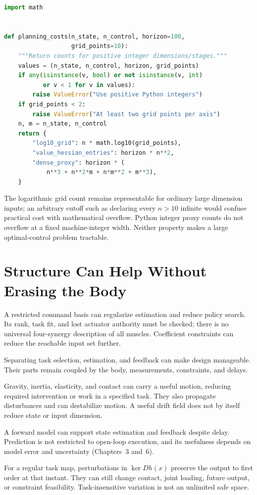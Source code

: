 \begin{lstlisting}[language=Python, caption={Conditional Counts, Not Runtime Benchmarks}]
import math


def planning_costs(n_state, n_control, horizon=100,
                   grid_points=10):
    """Return counts for positive integer dimensions/stages."""
    values = (n_state, n_control, horizon, grid_points)
    if any(isinstance(v, bool) or not isinstance(v, int)
           or v < 1 for v in values):
        raise ValueError("Use positive Python integers")
    if grid_points < 2:
        raise ValueError("At least two grid points per axis")
    n, m = n_state, n_control
    return {
        "log10_grid": n * math.log10(grid_points),
        "value_hessian_entries": horizon * n**2,
        "dense_proxy": horizon * (
            n**3 + n**2*m + n*m**2 + m**3),
    }
\end{lstlisting}

The logarithmic grid count remains representable for ordinary large dimension
inputs; an arbitrary cutoff such as declaring every $n>10$ infinite would
confuse practical cost with mathematical overflow. Python integer proxy counts
do not overflow at a fixed machine-integer width. Neither property makes a
large optimal-control problem tractable.

\section{Structure Can Help Without Erasing the Body}

\begin{description}[style=nextline]
  \item[Synergies.] A restricted command basis can regularize estimation and
  reduce policy search. Its rank, task fit, and lost actuator authority must
  be checked; there is no universal four-synergy description of all muscles.
  Coefficient constraints can reduce the reachable input set further.
  \item[Hierarchy.] Separating task selection, estimation, and feedback can
  make design manageable. Their parts remain coupled by the body, measurements,
  constraints, and delays.
  \item[Passive dynamics.] Gravity, inertia, elasticity, and contact can carry
  a useful motion, reducing required intervention or work in a specified
  task. They also propagate disturbances and can destabilize motion. A useful
  drift field does not by itself reduce state or input dimension.
  \item[Prediction.] A forward model can support state estimation and feedback
  despite delay. Prediction is not restricted to open-loop execution, and its
  usefulness depends on model error and uncertainty (Chapters~3 and~6).
  \item[Task coordinates.] For a regular task map, perturbations in
  $\ker Dh(x)$ preserve the output to first order at that instant. They can
  still change contact, joint loading, future output, or constraint feasibility.
  Task-insensitive variation is not an unlimited safe space.
\end{description}

